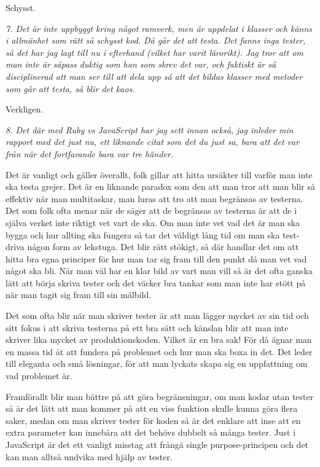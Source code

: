 \documentclass[11pt]{article}
\begin{document}
Schysst.

\emph{7. Det är inte uppbyggt kring något ramverk, men är uppdelat i klasser och känns i allmänhet som rätt så schysst kod. Då går det att testa. Det fanns inga tester, så det har jag lagt till nu i efterhand (vilket har varit lärorikt). Jag tror att om man inte är såpass duktig som han som skrev det var, och faktiskt är så disciplinerad att man ser till att dela upp så att det bildas klasser med metoder som går att testa, så blir det kaos.}

Verkligen.

\emph{8. Det där med Ruby vs JavaScript har jag sett innan också, jag inleder min rapport med det just nu, ett liknande citat som det du just sa, bara att det var från när det fortfarande bara var tre händer.}

Det är vanligt och gäller överallt, folk gillar att hitta ursäkter till varför man inte ska testa grejer. Det är en liknande paradox som den att man tror att man blir så effektiv när man multitaskar, man luras att tro att man begränsas av testerna. Det som folk ofta menar när de säger att de begränsas av testerna är att de i själva verket inte riktigt vet vart de ska. Om man inte vet vad det är man ska bygga och hur allting ska fungera så tar det väldigt lång tid om man ska test-driva någon form av lekstuga. Det blir rätt stökigt, så där handlar det om att hitta bra egna principer för hur man tar sig fram till den punkt då man vet vad något ska bli. När man väl har en klar bild av vart man vill så är det ofta ganska lätt att börja skriva tester och det väcker bra tankar som man inte har stött på när man tagit sig fram till sin målbild.

Det som ofta blir när man skriver tester är att man lägger mycket av sin tid och sitt fokus i att skriva testerna på ett bra sätt och känslan blir att man inte skriver lika mycket av produktionskoden. Vilket är en bra sak! För då ägnar man en massa tid åt att fundera på problemet och hur man ska boxa in det. Det leder till eleganta och små lösningar, för att man lyckats skapa sig en uppfattning om vad problemet är.

Framförallt blir man bättre på att göra begränsningar, om man kodar utan tester så är det lätt att man kommer på att en viss funktion skulle kunna göra flera saker, medan om man skriver tester för koden så är det enklare att inse att en extra parameter kan innebära att det behövs dubbelt så många tester. Just i JavaScript är det ett vanligt misstag att frångå single purpose-principen och det kan man alltså undvika med hjälp av tester.
\end{document}
